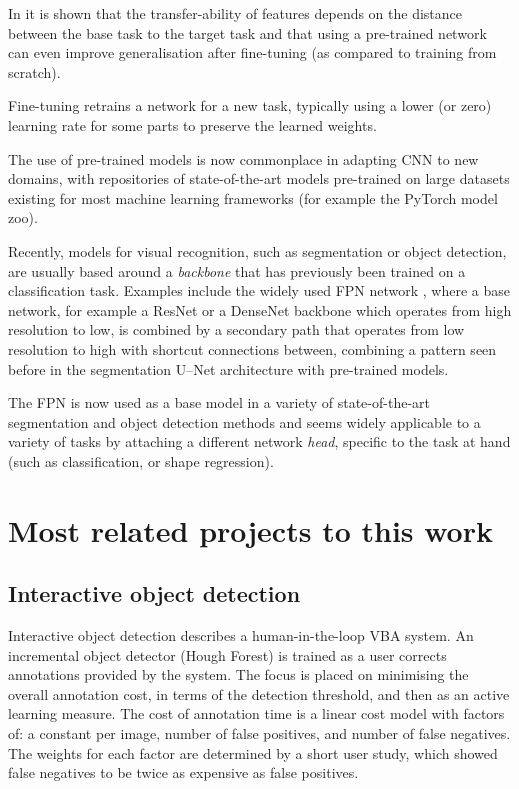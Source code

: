 In \cite{Yosinski} it is shown that the transfer-ability of features depends on the distance between the base task to the target task and that using a pre-trained network can even improve generalisation after fine-tuning (as compared to training from scratch).

Fine-tuning retrains a network for a new task, typically using a lower (or zero) learning rate for some parts to preserve the learned weights. 

The use of pre-trained models is now commonplace in adapting \gls{CNN} to new domains, with repositories of state-of-the-art models pre-trained on large datasets existing for most machine learning frameworks (for example the PyTorch \cite{Paszke2017} model zoo). 

Recently, models for visual recognition, such as segmentation or object detection, are usually based around a \emph{backbone} that has previously been trained on a classification task. Examples include the widely used \gls{FPN} network \cite{Lin2017a}, where a base network, for example a ResNet \cite{He} or a DenseNet \cite{Huang2016} backbone which operates from high resolution to low, is combined by a secondary path that operates from low resolution to high with shortcut connections between, combining a pattern seen before in the segmentation U--Net \cite{Ronneberger2015} architecture with pre-trained models.

The \gls{FPN} is now used as a base model in a variety of state-of-the-art segmentation and object detection methods and seems widely applicable to a variety of tasks by attaching a different network \emph{head}, specific to the task at hand (such as classification, or shape regression).

\section {Most related projects to this work}
\label{sec:closest}

\subsection {Interactive object detection \texorpdfstring{\cite{Yao2012}}{}}

Interactive object detection \cite{Yao2012} describes a human-in-the-loop \gls{VBA} system. An incremental object detector (Hough Forest) is trained as a user corrects annotations provided by the system. The focus is placed on minimising the overall annotation cost, in terms of the detection threshold, and then as an active learning measure. 
The cost of annotation time is a linear cost model with factors of: a constant per image, number of false positives, and number of false negatives. The weights for each factor are determined by a short user study, which showed false negatives to be twice as expensive as false positives. 


